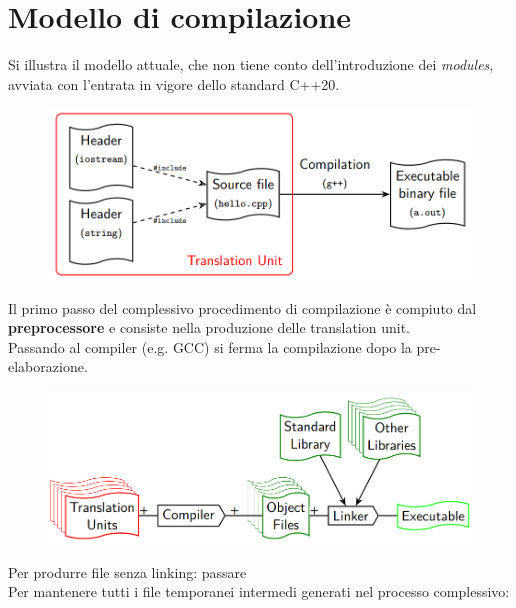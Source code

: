 \documentclass[10pt, oneside]{book}
\begin{document}
\chapter{Modello di compilazione}
Si illustra il modello attuale, che non tiene conto dell'introduzione dei \textit{modules}, avviata con l'entrata in vigore dello standard C++20.
\begin{figure}[h!]
\centering
\includegraphics[scale=0.7]{model.png}
\end{figure}
Il primo passo del complessivo procedimento di compilazione è compiuto dal \textbf{preprocessore} e consiste nella produzione delle translation unit.\\
Passando al compiler (e.g. GCC)  si ferma la compilazione dopo la pre-elaborazione.
\begin{figure}[h!]
\centering
\includegraphics[scale=0.7]{compilation2.png}
\end{figure}
Per produrre file senza linking: passare \\
Per mantenere tutti i file temporanei intermedi generati nel processo complessivo: 
\end{document}
